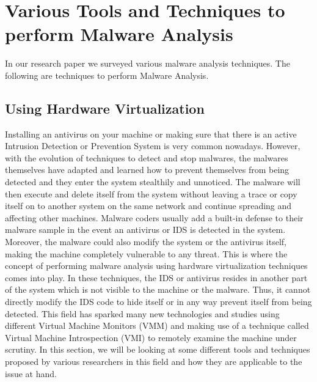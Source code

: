 \documentclass[11pt]{article}
\begin{document}
	\section{Various Tools and Techniques to perform Malware Analysis}
	In our research paper we surveyed various malware analysis techniques. The following are techniques to perform Malware Analysis.
	\subsection{Using Hardware Virtualization}
	Installing an antivirus on your machine or making sure that there is an active Intrusion Detection or Prevention System is very common nowadays. However, with the evolution of techniques to detect and stop malwares, the malwares themselves have adapted and learned how to prevent themselves from being detected and they enter the system stealthily and unnoticed. The malware will then execute and delete itself from the system without leaving a trace or copy itself on to another system on the same network and continue spreading and affecting other machines. Malware coders usually add a built-in defense to their malware sample in the event an antivirus or IDS is detected in the system. Moreover, the malware could also modify the system or the antivirus itself, making the machine completely vulnerable to any threat. This is where the concept of performing malware analysis using hardware virtualization techniques comes into play. In these techniques, the IDS or antivirus resides in another part of the system which is not visible to the machine or the malware. Thus, it cannot directly modify the IDS code to hide itself or in any way prevent itself from being detected. This field has sparked many new technologies and studies using different Virtual Machine Monitors (VMM) and making use of a technique called Virtual Machine Introspection (VMI) to remotely examine the machine under scrutiny. In this section, we will be looking at some different tools and techniques proposed by various researchers in this field and how they are applicable to the issue at hand.
\end{document}
